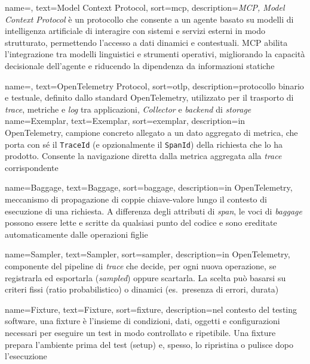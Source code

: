  {
    name=,
    text={Model Context Protocol},
    sort=mcp,
    description={\emph{MCP, Model Context Protocol} è un protocollo che consente a un agente basato su modelli di intelligenza artificiale di interagire con sistemi e servizi esterni in modo strutturato, permettendo l'accesso a dati dinamici e contestuali. MCP abilita l'integrazione tra modelli linguistici e strumenti operativi, migliorando la capacità decisionale dell'agente e riducendo la dipendenza da informazioni statiche}
}


 {
    name=,
    text={OpenTelemetry Protocol},
    sort=otlp,
    description={protocollo binario e testuale, definito dallo standard OpenTelemetry, utilizzato per il trasporto di \emph{trace}, metriche e \emph{log} tra applicazioni, \emph{Collector} e \emph{backend} di \emph{storage}}
}
 {
    name=Exemplar,
    text=Exemplar,
    sort=exemplar,
    description={in OpenTelemetry, campione concreto allegato a un dato aggregato di metrica, che porta con sé il \texttt{TraceId} (e opzionalmente il \texttt{SpanId}) della richiesta che lo ha prodotto. Consente la navigazione diretta dalla metrica aggregata alla \emph{trace} corrispondente}
}

 {
    name=Baggage,
    text=Baggage,
    sort=baggage,
    description={in OpenTelemetry, meccanismo di propagazione di coppie chiave-valore lungo il contesto di esecuzione di una richiesta. A differenza degli attributi di \emph{span}, le voci di \emph{baggage} possono essere lette e scritte da qualsiasi punto del codice e sono ereditate automaticamente dalle operazioni figlie}
}

 {
    name=Sampler,
    text=Sampler,
    sort=sampler,
    description={in OpenTelemetry, componente del pipeline di \emph{trace} che decide, per ogni nuova operazione, se registrarla ed esportarla (\emph{sampled}) oppure scartarla. La scelta può basarsi su criteri fissi (ratio probabilistico) o dinamici (es.\ presenza di errori, durata)}
}

 {
    name=Fixture,
    text=Fixture,
    sort=fixture,
    description={nel contesto del testing software, una fixture è l’insieme di condizioni, dati, oggetti e configurazioni necessari per eseguire un test in modo controllato e ripetibile. Una fixture prepara l’ambiente prima del test (setup) e, spesso, lo ripristina o pulisce dopo l’esecuzione}
}
